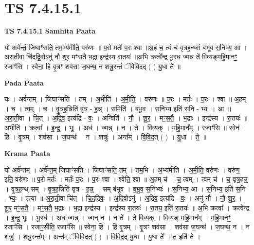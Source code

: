 \documentclass[17pt]{extarticle}
\begin{document}
\section{ TS 7.4.15.1 }

\textbf{TS 7.4.15.1 } \newline
\textbf{Samhita Paata} \newline

यो अर्व॑न्तं॒ जिघाꣳ॑सति॒ तम॒भ्य॑मीति॒ वरु॑णः ॥ प॒रो मर्तः॑ प॒रः श्वा ॥अ॒हं च॒ त्वं च॑ वृत्रह॒न्थ्सं ब॑भूव स॒निभ्य॒ आ । अ॒रा॒ती॒वा चि॑दद्रि॒वोऽनु॑ नौ शूर मꣳसतै भ॒द्रा इन्द्र॑स्य रा॒तयः॑ ॥अ॒भि क्रत्वे᳚न्द्र भू॒रध॒ ज्मन्न ते॑ विव्यङ्महि॒मानꣳ॒॒ रजाꣳ॑सि । स्वेना॒ हि वृ॒त्रꣳ शव॑सा ज॒घन्थ॒ न शत्रु॒रन्तं॑ ॅविविदद् ( ) यु॒धा ते᳚ ॥ \newline

\textbf{Pada Paata} \newline

यः । अर्व॑न्तम् । जिघाꣳ॑सति । तम् । अ॒भीति॑ । अ॒मी॒ति॒ । वरु॑णः ॥ प॒रः । मर्तः॑ । प॒रः । श्वा ॥ अ॒हम् । च॒ । त्वम् । च॒ । वृ॒त्र॒ह॒न्निति॑ वृत्र - ह॒न्न् । समिति॑ । ब॒भू॒व॒ । स॒निभ्य॒ इति॑ स॒नि - भ्यः॒ । आ ॥ अ॒रा॒ती॒वा । चि॒त् । अ॒द्रि॒व॒ इत्य॑द्रि - वः॒ । अन्विति॑ । नौ॒ । शू॒र॒ । मꣳ॒॒स॒तै॒ । भ॒द्राः । इन्द्र॑स्य । रा॒तयः॑ ॥ अ॒भीति॑ । क्रत्वा᳚ । इ॒न्द्र॒ । भूः॒ । अध॑ । ज्मन्न् । न । ते॒ । वि॒व्य॒क् । म॒हि॒मान᳚म् । रजाꣳ॑सि ॥ स्वेन॑ । हि । वृ॒त्रम् । शव॑सा । ज॒घन्थ॑ । न । शत्रुः॑ । अन्त᳚म् । वि॒वि॒द॒त् ( ) । यु॒धा । ते॒ ॥  \newline


\textbf{Krama Paata} \newline

यो अर्व॑न्तम् । अर्व॑न्त॒म् जिघाꣳ॑सति । जिघाꣳ॑सति॒ तम् । तम॒भि । अ॒भ्य॑मीति । अ॒मी॒ति॒ वरु॑णः । वरु॑ण॒ इति॒ वरु॑णः ॥ प॒रो मर्तः॑ । मर्तः॑ प॒रः । प॒रः श्वा । श्वेति॒ श्वा ॥ अ॒हम् च॑ । च॒ त्वम् । त्वम् च॑ । च॒ वृ॒त्र॒ह॒न्न्॒ । वृ॒त्र॒ह॒न्थ् सम् । वृ॒त्र॒ह॒न्निति॑ वृत्र - ह॒न्न्॒ । सम् ब॑भूव । ब॒भू॒व॒ स॒निभ्यः॑ । स॒निभ्य॒ आ । स॒निभ्य॒ इति॑ स॒नि - भ्यः॒ । एत्या ॥ अ॒रा॒ती॒वा चि॑त् । चि॒द॒द्रि॒वः॒ । अ॒द्रि॒वोऽनु॑ । अ॒द्रि॒व॒ इत्य॑द्रि - वः॒ । अनु॑ नौ । नौ॒ शू॒र॒ । शू॒र॒ मꣳ॒॒स॒तै॒ । मꣳ॒॒स॒तै॒ भ॒द्राः । भ॒द्रा इन्द्र॑स्य । इन्द्र॑स्य रा॒तयः॑ । रा॒तय॒ इति॑ रा॒तयः॑ ॥ अ॒भि क्रत्वा᳚ । क्रत्वे᳚न्द्र । इ॒न्द्र॒ भूः॒ । भू॒रध॑ । अध॒ ज्मन्न् । ज्मन् न । न ते᳚ । ते॒ वि॒व्य॒क्॒ । वि॒व्य॒ङ्‍ म॒हि॒मान᳚म् । म॒हि॒मानꣳ॒॒ रजाꣳ॑सि । रजाꣳ॒॒सीति॒ रजाꣳ॑सि ॥ स्वेना॒ हि । हि वृ॒त्रम् । वृ॒त्रꣳ शव॑सा । शव॑सा ज॒घन्थ॑ । ज॒घन्थ॒ न । न शत्रुः॑ । शत्रु॒रन्त᳚म् । अन्त॑म् ॅविविदत् ( ) । वि॒वि॒द॒द् यु॒धा । यु॒धा ते᳚ । त॒ इति॑ ते । \newline
\end{document}
